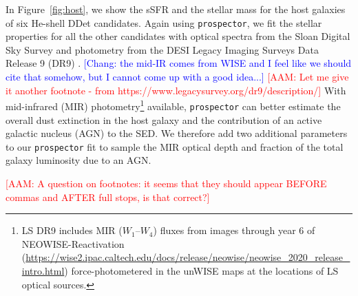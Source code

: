 \documentclass[twocolumn]{aastex631}
\newcommand{\adam}[1]{\textcolor{red}{[AAM: #1]}}
\newcommand{\chang}[1]{\textcolor{blue}{[Chang: #1]}}
\begin{document}
In Figure~\ref{fig:host}, we show the sSFR and the stellar mass for the host galaxies of six He-shell DDet candidates. Again using \texttt{prospector}, we fit the stellar properties for all the other candidates with optical spectra from the Sloan Digital Sky Survey \citep[SDSS;][]{York_2000} and photometry from the DESI Legacy Imaging Surveys Data Release 9 (DR9) \citep[LS;][$g$, $r$, $z$, $W_1$, $W_2$, $W_3$, $W_4$ magnitudes]{Dey_2019}. \chang{the mid-IR comes from WISE and I feel like we should cite that somehow, but I cannot come up with a good idea...} \adam{Let me give it another footnote - from https://www.legacysurvey.org/dr9/description/} With mid-infrared (MIR) photometry\footnote{LS DR9 includes MIR ($W_1$--$W_4$) fluxes from images through year 6 of NEOWISE-Reactivation (\url{https://wise2.ipac.caltech.edu/docs/release/neowise/neowise_2020_release_intro.html}) force-photometered in the unWISE \citep{Meisner_unwise_2018} maps at the locations of LS optical sources.} available, \texttt{prospector} can better estimate the overall dust extinction in the host galaxy and the contribution of an active galactic nucleus (AGN) to the SED. We therefore add two additional parameters to our \texttt{prospector} fit to sample the MIR optical depth and fraction of the total galaxy luminosity due to an AGN.

\adam{A question on footnotes: it seems that they should appear BEFORE commas and AFTER full stops, is that correct?}
\end{document}
